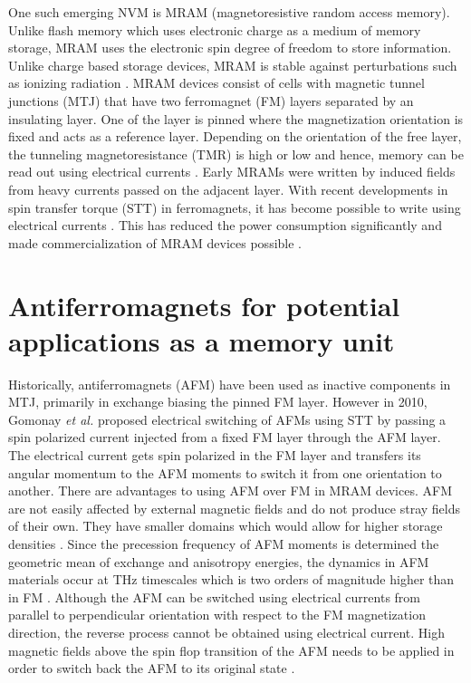 \documentclass[10pt,doublespacing,edeposit]{uiucthesis2020}
\begin{document}
\begin{mainmatter}
One such emerging NVM is MRAM (magnetoresistive random access memory). Unlike flash memory which uses electronic charge as a medium of memory storage, MRAM uses the electronic spin degree of freedom to store information. Unlike charge based storage devices, MRAM is stable against perturbations such as ionizing radiation \cite{Wadley2016}. MRAM devices consist of cells with magnetic tunnel junctions (MTJ) that have two ferromagnet (FM) layers separated by an insulating layer. One of the layer is pinned where the magnetization orientation is fixed and acts as a reference layer. Depending on the orientation of the free layer, the tunneling magnetoresistance (TMR) is high or low and hence, memory can be read out using electrical currents \cite{Krishnan2016}. Early MRAMs were written by induced fields from heavy currents passed on the adjacent layer. With recent developments in spin transfer torque (STT) in ferromagnets, it has become possible to write using electrical currents \cite{Chappert2007}. This has reduced the power consumption significantly and made commercialization of MRAM devices possible \cite{Krishnan2016,Bhatti2017}.

\section{Antiferromagnets for potential applications as a memory unit}

Historically, antiferromagnets (AFM) have been used as inactive components in MTJ, primarily in exchange biasing the pinned FM layer. However in 2010, Gomonay \emph{et al.} \cite{Gomonay2010} proposed electrical switching of AFMs using STT by passing a spin polarized current injected from a fixed FM layer through the AFM layer. The electrical current gets spin polarized in the FM layer and transfers its angular momentum to the AFM moments to switch it from one orientation to another. There are advantages to using AFM over FM in MRAM devices. AFM are not easily affected by external magnetic fields and do not produce stray fields of their own. They have smaller domains which would allow for higher storage densities \cite{Wadley2016}. Since the precession frequency of AFM moments is determined the geometric mean of exchange and anisotropy energies, the dynamics in AFM materials occur at THz timescales which is two orders of magnitude higher than in FM \cite{Siddiqui2020}. Although the AFM can be switched using electrical currents from parallel to perpendicular orientation with respect to the FM magnetization direction, the reverse process cannot be obtained using electrical current. High magnetic fields above the spin flop transition of the AFM needs to be applied in order to switch back the AFM to its original state \cite{Gomonay2010}.


\end{mainmatter}
\end{document}
